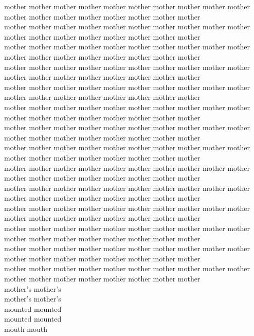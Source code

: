 mother mother mother mother mother mother mother mother mother mother mother mother mother mother mother mother mother mother\\
mother mother mother mother mother mother mother mother mother mother mother mother mother mother mother mother mother mother\\
mother mother mother mother mother mother mother mother mother mother mother mother mother mother mother mother mother mother\\
mother mother mother mother mother mother mother mother mother mother mother mother mother mother mother mother mother mother\\
mother mother mother mother mother mother mother mother mother mother mother mother mother mother mother mother mother mother\\
mother mother mother mother mother mother mother mother mother mother mother mother mother mother mother mother mother mother\\
mother mother mother mother mother mother mother mother mother mother mother mother mother mother mother mother mother mother\\
mother mother mother mother mother mother mother mother mother mother mother mother mother mother mother mother mother mother\\
mother mother mother mother mother mother mother mother mother mother mother mother mother mother mother mother mother mother\\
mother mother mother mother mother mother mother mother mother mother mother mother mother mother mother mother mother mother\\
mother mother mother mother mother mother mother mother mother mother mother mother mother mother mother mother mother mother\\
mother mother mother mother mother mother mother mother mother mother mother mother mother mother mother mother mother mother\\
mother mother mother mother mother mother mother mother mother mother mother mother mother mother mother mother mother mother\\
mother mother mother mother mother mother mother mother mother mother mother mother mother mother mother mother mother mother\\
mother's mother's\\
mother's mother's\\
mounted mounted\\
mounted mounted\\
mouth mouth\\
